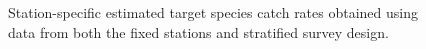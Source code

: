 \documentclass[12pt]{article}\usepackage[]{graphicx}\usepackage[]{color}
\begin{document}
\begin{figure}[htb]

{\centering {} 

}

\caption{Station-specific estimated target species catch rates obtained using data from both the fixed stations and stratified survey design.}\label{fig:target-spat}
\end{figure}
\end{document}

